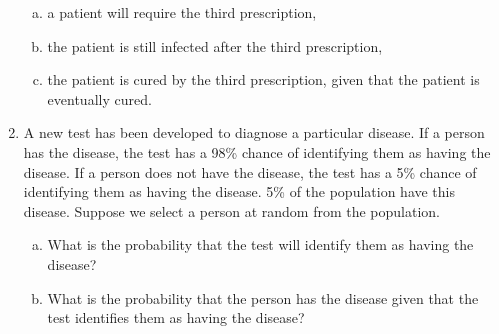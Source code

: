 \documentclass[a4paper,12pt]{article}
\begin{document}
\begin{enumerate}
\begin{enumerate}[(a)]
\item a patient will require the third prescription,
\item the patient is still infected after the third prescription,
\item the patient is cured by the third prescription, given that the patient is eventually cured.
\end{enumerate}





\item A new test has been developed to diagnose a particular disease. 
If a person has the disease, the test has a 98\% chance of identifying them as having the 
disease. If a person does not have the disease, the test has a 5\% chance of identifying them as having the disease. 5\% of the population have this disease. 
Suppose we select a person at random from the population.

\begin{enumerate}[(a)]
\item What is the probability that the test will identify them as having the disease?
\item What is the probability that the person has the disease given that the test identifies 
them as having the disease?
\end{enumerate}



\end{enumerate}
\end{document}
